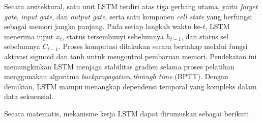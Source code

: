 Secara arsitektural, satu unit LSTM terdiri atas tiga gerbang utama, yaitu \textit{forget gate}, \textit{input gate}, dan \textit{output gate}, serta satu komponen \textit{cell state} yang berfungsi sebagai memori jangka panjang. Pada setiap langkah waktu ke-$t$, LSTM menerima input $x_t$, status tersembunyi sebelumnya $h_{t-1}$, dan status sel sebelumnya $C_{t-1}$. Proses komputasi dilakukan secara bertahap melalui fungsi aktivasi sigmoid dan tanh untuk mengontrol pembaruan memori. Pendekatan ini memungkinkan LSTM menjaga stabilitas gradien selama proses pelatihan menggunakan algoritma \textit{backpropagation through time} (BPTT). Dengan demikian, LSTM mampu menangkap dependensi temporal yang kompleks dalam data sekuensial.

Secara matematis, mekanisme kerja LSTM dapat dirumuskan sebagai berikut:

